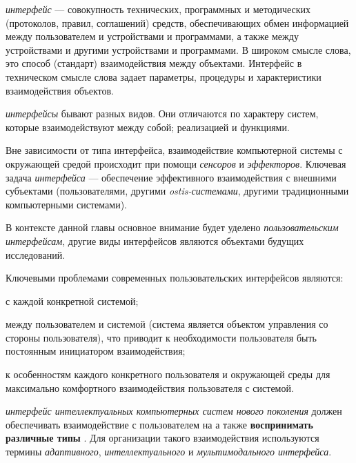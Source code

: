 \textit{интерфейс} --- совокупность технических, программных и методических (протоколов, правил, соглашений) средств, обеспечивающих обмен информацией между пользователем и устройствами и программами, а также между устройствами и другими устройствами и программами. В широком смысле слова, это способ (стандарт) взаимодействия между объектами. Интерфейс в техническом смысле слова задает параметры, процедуры и характеристики взаимодействия объектов.

\textit{интерфейсы} бывают разных видов. Они отличаются по характеру систем, которые взаимодействуют между собой; реализацией и функциями.

Вне зависимости от типа интерфейса, взаимодействие компьютерной системы с окружающей средой происходит при помощи \textit{сенсоров} и \textit{эффекторов}.
Ключевая задача \textit{интерфейса} --- обеспечение эффективного взаимодействия с внешними субъектами (пользователями, другими \textit{ostis-системами}, другими традиционными компьютерными системами).

В контексте данной главы основное внимание будет уделено \textit{пользовательским интерфейсам}, другие виды интерфейсов являются объектами будущих исследований.

Ключевыми проблемами современных пользовательских интерфейсов являются:
\begin{textitemize}
	\item {} с каждой конкретной системой;
	\item {} между пользователем и системой (система является объектом управления со стороны пользователя), что приводит к необходимости пользователя быть постоянным инициатором взаимодействия;
	\item {} к особенностям каждого конкретного пользователя и окружающей среды для максимально комфортного взаимодействия пользователя с системой.
\end{textitemize}

\textit{интерфейс интеллектуальных компьютерных систем нового поколения} должен обеспечивать взаимодействие с пользователем на  а также \textbf{воспринимать различные типы} . Для организации такого взаимодействия используются термины \textit{адаптивного}, \textit{интеллектуального} и \textit{мультимодального интерфейса}.

